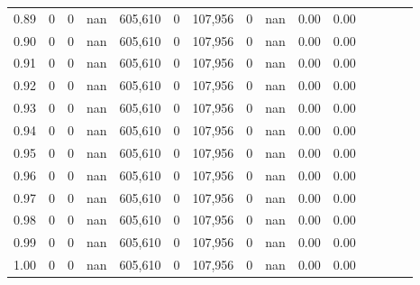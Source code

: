 \begin{tabular}{rrrcrrrrrrrrrrr}
0.89 &       0 &      0 &                                        nan &  605,610 &        0 &  107,956 &        0 &   nan &  0.00 &                         0.00 \\
0.90 &       0 &      0 &                                        nan &  605,610 &        0 &  107,956 &        0 &   nan &  0.00 &                         0.00 \\
0.91 &       0 &      0 &                                        nan &  605,610 &        0 &  107,956 &        0 &   nan &  0.00 &                         0.00 \\
0.92 &       0 &      0 &                                        nan &  605,610 &        0 &  107,956 &        0 &   nan &  0.00 &                         0.00 \\
0.93 &       0 &      0 &                                        nan &  605,610 &        0 &  107,956 &        0 &   nan &  0.00 &                         0.00 \\
0.94 &       0 &      0 &                                        nan &  605,610 &        0 &  107,956 &        0 &   nan &  0.00 &                         0.00 \\
0.95 &       0 &      0 &                                        nan &  605,610 &        0 &  107,956 &        0 &   nan &  0.00 &                         0.00 \\
0.96 &       0 &      0 &                                        nan &  605,610 &        0 &  107,956 &        0 &   nan &  0.00 &                         0.00 \\
0.97 &       0 &      0 &                                        nan &  605,610 &        0 &  107,956 &        0 &   nan &  0.00 &                         0.00 \\
0.98 &       0 &      0 &                                        nan &  605,610 &        0 &  107,956 &        0 &   nan &  0.00 &                         0.00 \\
0.99 &       0 &      0 &                                        nan &  605,610 &        0 &  107,956 &        0 &   nan &  0.00 &                         0.00 \\
1.00 &       0 &      0 &                                        nan &  605,610 &        0 &  107,956 &        0 &   nan &  0.00 &                         0.00 \\
\bottomrule
\end{tabular}
